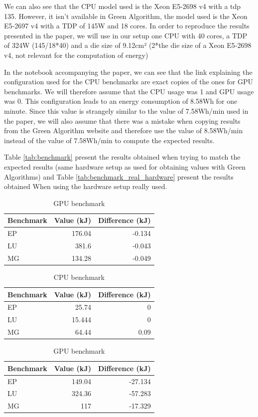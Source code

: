 \documentclass[11pt]{article}
\begin{document}
We can also see that the CPU model used is the Xeon E5-2698 v4 with a
tdp 135. However, it isn't available in Green Algorithm, the model
used is the Xeon E5-2697 v4 with a \gls{TDP} of 145W and 18 cores.
In order to reproduce the results presented in the paper, we will use
in our setup one CPU with 40 cores, a \gls{TDP} of 324W (145/18*40) and a
die size of 9.12cm² (2*the die size of a Xeon E5-2698 v4, not relevant
for the computation of energy)

In the notebook accompanying the paper, we can see that the link explaining the configuration used for the CPU benchmarks are
exact copies of the ones for GPU benchmarks. We will therefore assume
that the CPU usage was 1 and GPU usage was 0. This configuration leads
to an energy consumption of 8.58Wh for one minute. Since this value is
strangely similar to the value of 7.58Wh/min used in the paper, we will also assume that there was a mistake when copying
results from the Green Algorithm website and therefore use the value
of 8.58Wh/min instead of the value of 7.58Wh/min to compute the
expected results.

Table \ref{tab:benchmark} present the results obtained when trying to match the expected results (same hardware setup as used for
obtaining values with Green Algorithms) and Table \ref{tab:benchmark_real_hardware} present the results obtained When using the hardware setup really used.
\begin{table}[htbp]
\caption{GPU benchmark}
\centering
\begin{tabular}{lrr}
Benchmark & Value (kJ) & Difference (kJ)\\
\hline
EP & 176.04 & -0.134\\
LU & 381.6 & -0.043\\
MG & 134.28 & -0.049\\
\end{tabular}
\end{table}

\begin{table}[htbp]
\caption{CPU benchmark}
\centering
\begin{tabular}{lrr}
Benchmark & Value (kJ) & Difference (kJ)\\
\hline
EP & 25.74 & 0\\
LU & 15.444 & 0\\
MG & 64.44 & 0.09\\
\end{tabular}
\end{table}

\begin{table}[htbp]
\caption{GPU benchmark}
\centering
\begin{tabular}{lrr}
Benchmark & Value (kJ) & Difference (kJ)\\
\hline
EP & 149.04 & -27.134\\
LU & 324.36 & -57.283\\
MG & 117 & -17.329\\
\end{tabular}
\end{table}
\end{document}
